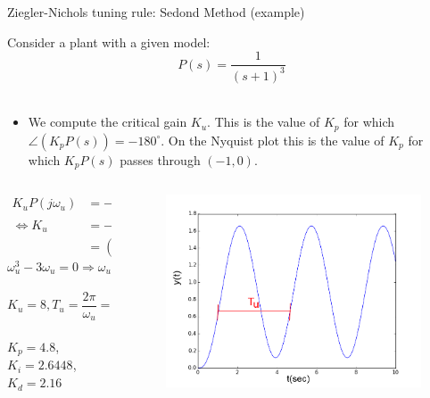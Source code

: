 \begin{frame}{Ziegler-Nichols tuning rule: Sedond Method (example)}
	\vspace{-1em}
	\footnotesize{
	\begin{example}
		Consider a plant with a given model:\\
		\vspace{-0.5em}
		$$ P(s) = \frac{1}{(s+1)^3} $$\\
		\vspace{-0.7em}
		\begin{itemize}
		\item We compute the critical gain $K_u$. This is the value of $K_p$ for which $\angle (K_p P(s)) = - 180^\circ$. On the Nyquist plot this is the value of $K_p$ for which $K_p P(s)$ passes through $(-1,0)$.\\
		\end{itemize}
		\vspace{-1.5em}
		\begin{columns}
			\begin{column}{0.5 \textwidth}
				\begin{align*}
				K_uP(j\omega_u) &= -1 \\ \Leftrightarrow K_u &= 	-(j\omega_u + 1)^3 \\
				& = (3\omega_u^2-1)+j(\omega_u^3 - 3\omega_u)
				\end{align*}
				\vspace{-1.5em}
				$$ \omega_u^3-3\omega_u = 0 \Rightarrow \omega_u = \sqrt{3}$$\\
				\vspace{-1.5em}
				$$K_u = 8, T_u = \frac{2\pi}{\omega_u} = 3.628$$\\
				$K_p = 4.8$, $K_i = 2.6448$, $K_d =  2.16$
			\end{column}
			\begin{column}{0.4 \textwidth}
			\begin{figure}
				\centering
				\includegraphics[width=1\linewidth]{img/Z_N_PID_example}
			\end{figure}
			\end{column}
		\end{columns}
	\end{example}}
\end{frame}

